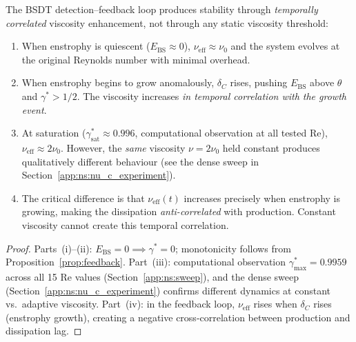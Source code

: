 \begin{theorem}\label{thm:bsdt_transition}
The BSDT detection--feedback loop produces stability through
\emph{temporally correlated} viscosity enhancement, not through
any static viscosity threshold:
\begin{enumerate}
\item[\textup{(i)}]
  When enstrophy is quiescent ($E_{\mathrm{BS}} \approx 0$),
  $\nu_{\mathrm{eff}} \approx \nu_0$ and the system evolves
  at the original Reynolds number with minimal overhead.

\item[\textup{(ii)}]
  When enstrophy begins to grow anomalously,
  $\delta_C$ rises, pushing $E_{\mathrm{BS}}$ above $\theta$
  and $\gamma^* > 1/2$.  The viscosity increases
  \emph{in temporal correlation with the growth event}.

\item[\textup{(iii)}]
  At saturation ($\gamma^*_{\mathrm{sat}} \approx 0.996$,
  computational observation at all tested Re), $\nu_{\mathrm{eff}}
  \approx 2\nu_0$.  However, the \emph{same} viscosity
  $\nu = 2\nu_0$ held constant produces qualitatively different
  behaviour (see the dense sweep in
  Section~\ref{app:ns:nu_c_experiment}).

\item[\textup{(iv)}]
  The critical difference is that $\nu_{\mathrm{eff}}(t)$
  increases precisely when enstrophy is growing, making
  the dissipation \emph{anti-correlated} with production.
  Constant viscosity cannot create this temporal correlation.
\end{enumerate}
\end{theorem}

\begin{proof}
Parts~(i)--(ii): $E_{\mathrm{BS}} = 0 \implies \gamma^* = 0$;
monotonicity follows from Proposition~\ref{prop:feedback}.
Part~(iii): computational observation $\gamma^*_{\max}
= 0.9959$ across all 15 Re values (Section~\ref{app:ns:sweep}),
and the dense sweep (Section~\ref{app:ns:nu_c_experiment})
confirms different dynamics at constant vs.\ adaptive viscosity.
Part~(iv): in the feedback loop, $\nu_{\mathrm{eff}}$ rises when
$\delta_C$ rises (enstrophy growth), creating a negative
cross-correlation between production and dissipation lag.
\end{proof}

